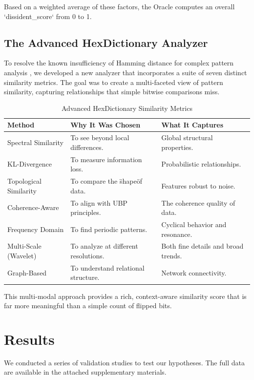 \documentclass[12pt, a4paper]{article}
\begin{document}
Based on a weighted average of these factors, the Oracle computes an overall `dissident_score` from 0 to 1.

\subsection{The Advanced HexDictionary Analyzer}
To resolve the known insufficiency of Hamming distance for complex pattern analysis \cite{nutrition_study}, we developed a new analyzer that incorporates a suite of seven distinct similarity metrics. The goal was to create a multi-faceted view of pattern similarity, capturing relationships that simple bitwise comparisons miss.

\begin{table}[h!]
\centering
\caption{Advanced HexDictionary Similarity Metrics}
\label{tab:hex_methods}
\begin{tabular}{@{}lll@{}}
\toprule
\textbf{Method} & \textbf{Why It Was Chosen} & \textbf{What It Captures} \\
\midrule
Spectral Similarity & To see beyond local differences. & Global structural properties. \\
KL-Divergence & To measure information loss. & Probabilistic relationships. \\
Topological Similarity & To compare the \"shape\" of data. & Features robust to noise. \\
Coherence-Aware & To align with UBP principles. & The coherence quality of data. \\
Frequency Domain & To find periodic patterns. & Cyclical behavior and resonance. \\
Multi-Scale (Wavelet) & To analyze at different resolutions. & Both fine details and broad trends. \\
Graph-Based & To understand relational structure. & Network connectivity. \\
\bottomrule
\end{tabular}
\end{table}

This multi-modal approach provides a rich, context-aware similarity score that is far more meaningful than a simple count of flipped bits.

\section{Results}
We conducted a series of validation studies to test our hypotheses. The full data are available in the attached supplementary materials.
\end{document}
